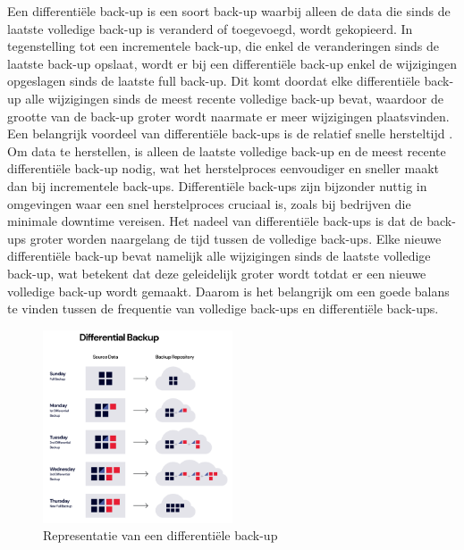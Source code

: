 Een differentiële back-up is een soort back-up waarbij alleen de data die sinds de laatste volledige back-up is veranderd of toegevoegd, wordt gekopieerd. In tegenstelling tot een incrementele back-up, die enkel de veranderingen sinds de laatste back-up opslaat, wordt er bij een differentiële back-up enkel de wijzigingen opgeslagen sinds de laatste full back-up. Dit komt doordat elke differentiële back-up alle wijzigingen sinds de meest recente volledige back-up bevat, waardoor de grootte van de back-up groter wordt naarmate er meer wijzigingen plaatsvinden. Een belangrijk voordeel van differentiële back-ups is de relatief snelle hersteltijd \autocite{Beard2018}. Om data te herstellen, is alleen de laatste volledige back-up en de meest recente differentiële back-up nodig, wat het herstelproces eenvoudiger en sneller maakt dan bij incrementele back-ups. Differentiële back-ups zijn bijzonder nuttig in omgevingen waar een snel herstelproces cruciaal is, zoals bij bedrijven die minimale downtime vereisen. Het nadeel van differentiële back-ups is dat de back-ups groter worden naargelang de tijd tussen de volledige back-ups. Elke nieuwe differentiële back-up bevat namelijk alle wijzigingen sinds de laatste volledige back-up, wat betekent dat deze geleidelijk groter wordt totdat er een nieuwe volledige back-up wordt gemaakt. Daarom is het belangrijk om een goede balans te vinden tussen de frequentie van volledige back-ups en differentiële back-ups.
\begin{figure}[h]
    \centering
    \includegraphics[width=0.5\textwidth]{img/diff.png}  
    \caption{Representatie van een differentiële back-up \autocite{Rivas2022}}   
    \label{fig:diffrback-up}           
\end{figure}

